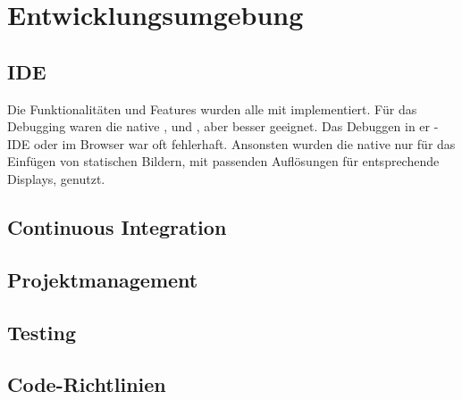 \chapter{Entwicklungsumgebung}
\label{pd-entwicklungsumgebung}


\section{IDE}
Die Funktionalitäten und Features wurden alle mit  implementiert. 
Für das Debugging waren die native ,  und , aber besser geeignet. 
Das Debuggen in er -\gls{IDE} oder im  Browser war oft fehlerhaft. 
Ansonsten wurden die native  nur für das Einfügen von statischen Bildern, mit passenden Auflösungen für entsprechende Displays, genutzt. 


\section{Continuous Integration}


\section{Projektmanagement}


\section{Testing}


\section{Code-Richtlinien}